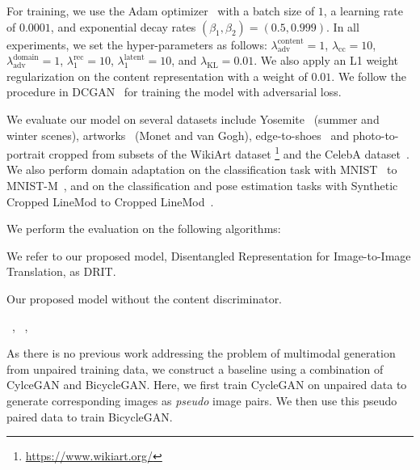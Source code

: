 \documentclass[runningheads]{llncs}
\begin{document}
For training, we use the Adam optimizer~\cite{kinga2015adam} with a batch size of $1$, a learning rate of $0.0001$, and exponential decay rates $(\beta_1, \beta_2) = (0.5, 0.999)$.
%
In all experiments, we set the hyper-parameters as follows: $\lambda^{\mathrm{content}}_{\mathrm{adv}}=1$, $ \lambda_{\mathrm{cc}}=10$, $\lambda^{\mathrm{domain}}_{\mathrm{adv}}=1$, $ \lambda_1^{\mathrm{rec}} =10$,  $\lambda_1^{\mathrm{latent}}=10$, and $\lambda_{\mathrm{KL}}=0.01$. 
%
We also apply an L1 weight regularization on the content representation with a weight of $0.01$. 
%
We follow the procedure in DCGAN~\cite{radford2016dcgan} for training the model with adversarial loss.

\vspace{\paramargin}
%
We evaluate our model on several datasets include Yosemite~\cite{zhu2017cyclegan} (summer and winter scenes), artworks~\cite{zhu2017cyclegan} (Monet and van Gogh), edge-to-shoes~\cite{Yu2014edge2shoe} and photo-to-portrait cropped from subsets of the WikiArt dataset \footnote{\url{https://www.wikiart.org/}} and the CelebA dataset~\cite{liu2015celeb}. 
%
We also perform domain adaptation on the classification task with MNIST~\cite{lecun1998MNIST} to MNIST-M~\cite{ganin2016MNISTM}, and on the classification and pose estimation tasks with Synthetic Cropped LineMod to Cropped LineMod~\cite{hinterstoisser2012linemod,wohlhart2015croplinemod}.

\vspace{-3mm}
\vspace{\paramargin}
We perform the evaluation on the following algorithms:
\begin{compactitem}
\item {} We refer to our proposed model, Disentangled Representation for Image-to-Image Translation, as DRIT.
\item {} Our proposed model without the content discriminator.
\item{}~\cite{zhu2017cyclegan}, ~\cite{liu2017unit}, ~\cite{zhu2017bicyclegan}
\item {} As there is no previous work addressing the problem of multimodal generation from unpaired training data, we construct a baseline using a combination of CylceGAN and BicycleGAN. Here, we first train CycleGAN on unpaired data to generate corresponding images as \emph{pseudo} image pairs. We then use this pseudo paired data to train BicycleGAN.
\end{compactitem}
\end{document}
